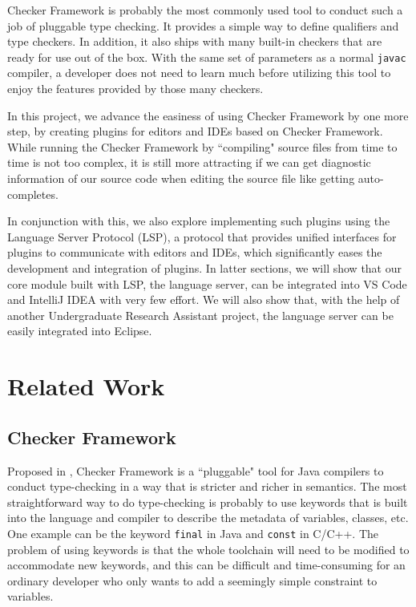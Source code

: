 \documentclass{article}
\begin{document}
Checker Framework\cite{cf} is probably the most commonly used tool to conduct such a job of pluggable type checking. It provides a simple way to define qualifiers and type checkers. In addition, it also ships with many built-in checkers that are ready for use out of the box.  With the same set of parameters as a normal \verb|javac| compiler, a developer does not need to learn much before utilizing this tool to enjoy the features provided by those many checkers.

In this project, we advance the easiness of using Checker Framework by one more step, by creating plugins for editors and IDEs based on Checker Framework.  While running the Checker Framework by ``compiling" source files from time to time is not too complex, it is still more attracting if we can get diagnostic information of our source code when editing the source file like getting auto-completes.

In conjunction with this, we also explore implementing such plugins using the Language Server Protocol (LSP)\cite{lsp}, a protocol that provides unified interfaces for plugins to communicate with editors and IDEs, which significantly eases the development and integration of plugins. In latter sections, we will show that our core module built with LSP, the language server, can be integrated into VS Code and IntelliJ IDEA with very few effort. We will also show that, with the help of another Undergraduate Research Assistant project, the language server can be easily integrated into Eclipse.

\section{Related Work}

\subsection{Checker Framework}

Proposed in \cite{cf-ori}, Checker Framework is a ``pluggable" tool for Java compilers to conduct type-checking in a way that is stricter and richer in semantics.  The most straightforward way to do type-checking is probably to use keywords that is built into the language and compiler to describe the metadata of variables, classes, etc. One example can be the keyword \verb|final| in Java and \verb|const| in C/C++. The problem of using keywords is that the whole toolchain will need to be modified to accommodate new keywords, and this can be difficult and time-consuming for an ordinary developer who only wants to add a seemingly simple constraint to variables. 
\end{document}
